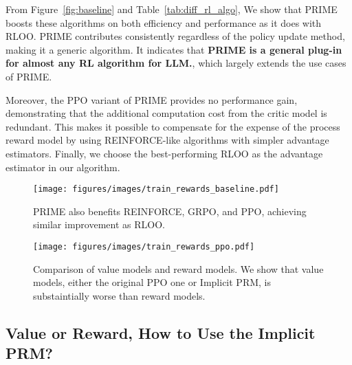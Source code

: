 From Figure~\ref{fig:baseline} and Table~\ref{tab:diff_rl_algo}, We show that PRIME boosts these algorithms on both efficiency and performance as it does with RLOO. PRIME contributes consistently regardless of the policy update method, making it a generic algorithm. 
It indicates that \textbf{PRIME is a general plug-in for almost any RL algorithm for LLM.}, which largely extends the use cases of PRIME.

Moreover, the PPO variant of PRIME provides no performance gain, demonstrating that the additional computation cost from the critic model is redundant. This makes it possible to compensate for the expense of the process reward model by using REINFORCE-like algorithms with simpler advantage estimators. Finally, we choose the best-performing RLOO as the advantage estimator in our algorithm. 




\begin{figure}[t] %
    \centering %
    \begin{minipage}[t]{0.46\textwidth} %
        \texttt{[image: figures/images/train\_rewards\_baseline.pdf]}
        \caption{PRIME also benefits REINFORCE, GRPO, and PPO, achieving similar improvement as RLOO.} 
        \label{fig:baseline}
    \end{minipage}
    \hspace{5pt}
    \begin{minipage}[t]{0.51\textwidth} %
        \centering
        \texttt{[image: figures/images/train\_rewards\_ppo.pdf]}
        \caption{Comparison of value models and reward models. We show that value models, either the original PPO one or Implicit PRM, is substaintially worse than reward models.}
        \label{fig:ppo}
    \end{minipage}
\end{figure}
\subsection{Value or Reward, How to Use the Implicit PRM? }
\label{sec:ppo}



